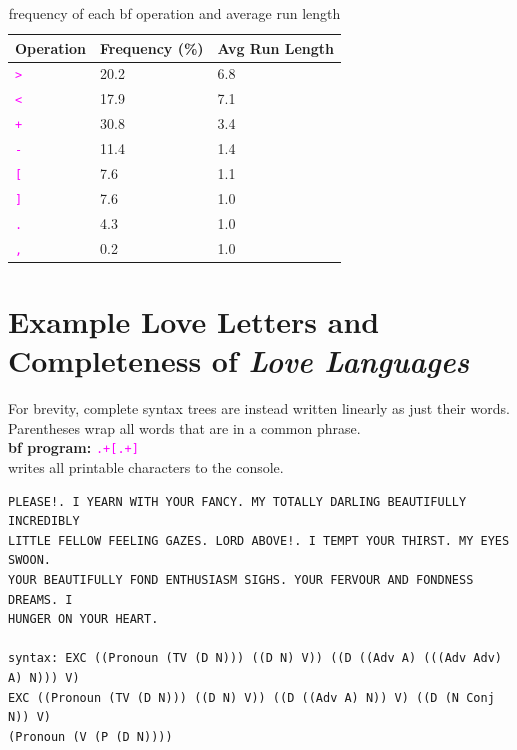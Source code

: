 \documentclass[runningheads]{llncs}
\newcommand{\code}[1]{\texttt{\textcolor{magenta}{\setlength{\fboxsep}{1pt}\colorbox{lightgray!20}{#1}}}}
\begin{document}
\begin{table}[H]
\centering
\begin{tabular}{@{}l l l@{}}
\toprule
\textbf{Operation}\;\; & \textbf{Frequency (\%)}\;\; & \textbf{Avg Run Length} \\ \midrule
\code{>}  & 20.2  & 6.8  \\
\code{<}  & 17.9  & 7.1  \\
\code{+}  & 30.8  & 3.4  \\
\code{-}  & 11.4  & 1.4  \\
\code{[}  & 7.6  & 1.1  \\
\code{]}  & 7.6   & 1.0  \\
\code{.}  & 4.3   & 1.0  \\
\code{,}  & 0.2   & 1.0   \\ \bottomrule
\end{tabular}
\vspace{1em}
\caption{frequency of each bf operation and average run length}
\end{table}

\newpage
\section{Example Love Letters and Completeness of \textit{Love Languages}} \label{app:examples}
For brevity, complete syntax trees are instead written linearly as just their words. Parentheses wrap all words that are in a common phrase.\\

\noindent
\textbf{bf program:} \code{.+[.+]}\\
writes all printable characters to the console.
\begin{verbatim}
PLEASE!. I YEARN WITH YOUR FANCY. MY TOTALLY DARLING BEAUTIFULLY INCREDIBLY
LITTLE FELLOW FEELING GAZES. LORD ABOVE!. I TEMPT YOUR THIRST. MY EYES SWOON.
YOUR BEAUTIFULLY FOND ENTHUSIASM SIGHS. YOUR FERVOUR AND FONDNESS DREAMS. I
HUNGER ON YOUR HEART.

syntax: EXC ((Pronoun (TV (D N))) ((D N) V)) ((D ((Adv A) (((Adv Adv) A) N))) V)
EXC ((Pronoun (TV (D N))) ((D N) V)) ((D ((Adv A) N)) V) ((D (N Conj N)) V)
(Pronoun (V (P (D N))))
\end{verbatim}
\end{document}
